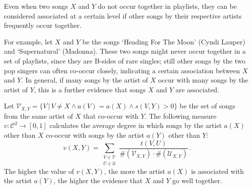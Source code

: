 Even when two songs $X$ and $Y$ do not occur together in playlists, they can be considered associated at a certain level if other songs by their respective artists frequently occur together.

For example, let $X$ and $Y$ be the songs `Heading For The Moon' (Cyndi Lauper) and `Supernatural' (Madonna).
These two songs might never occur together in a set of playlists, since they are B-sides of rare singles; still other songs by the two pop singers can often co-occur closely, indicating a certain association between $X$ and $Y$.
In general, if many songs by the artist of $X$ occur with many songs by the artist of $Y$, this is a further evidence that songs $X$ and $Y$ are associated.

Let $\mathcal{V}_{X,Y} = \{V\,|\,V \neq X \wedge a(V) = a(X) \wedge s(V,Y) > 0 \}$ be the set of songs from the same artist of $X$ that co-occur with $Y$.
The following measure $v: \mathcal{C}^2 \to [0,1]$ calculates the average degree in which songs by the artist $a(X)$ other than $X$ co-occur with songs by the artist $a(Y)$ other than $Y$:
\begin{equation}\label{eq:artist_to_artist}
	v(X,Y) = \sum_{\substack{V \in \mathcal{V}\\U \in \mathcal{U}}}  \frac{t(V,U)}{\#(\mathcal{V}_{X,Y}) \cdot \#(\mathcal{U}_{X,Y})}\,.
\end{equation}
The higher the value of $v(X,Y)$, the more the artist $a(X)$ is associated with the artist $a(Y)$, the higher the evidence that $X$ and $Y$ go well together. 



%


